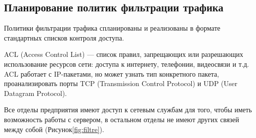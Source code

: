 
\subsection{Планирование политик фильтрации трафика}

Политики фильтрации трафика спланированы и реализованы в формате стандартных списков контроля доступа. 

ACL (Access Control List) — список правил, запрещающих или разрешающих использование ресурсов сети: доступа к интернету, телефонии, видеосвязи и т.д. ACL работает с IP-пакетами, но может узнать тип конкретного пакета, проанализировать порты TCP (Transmission Control Protocol) и UDP (User Datagram Protocol).

Все отделы предприятия имеют доступ к сетевым службам для того, чтобы иметь возможность работы с сервером, в остальном отделы не имеют других связей между собой (Рисунок\;\ref{fig:filtre}).


